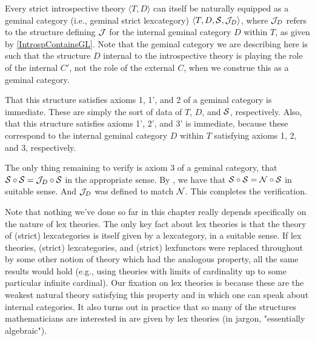 \begin{construction}
Every strict introspective theory $\langle T, D \rangle$ can itself be naturally equipped as a geminal category (i.e., geminal strict lexcategory) $\langle T, D, \mathcal{S}, \mathcal{J}_D \rangle$, where $\mathcal{J}_D$ refers to the structure defining $\mathcal{J}$ for the internal geminal category $D$ within $T$, as given by \cref{IntrospContainsGL}. Note that the geminal category we are describing here is such that the structure $D$ internal to the introspective theory is playing the role of the internal $C'$, not the role of the external $C$, when we construe this as a geminal category.

That this structure satisfies axioms 1, 1', and 2 of a geminal category is immediate. These are simply the sort of data of $T$, $D$, and $\mathcal{S}$, respectively. Also, that this structure satisfies axioms 1', 2', and 3' is immediate, because these correspond to the internal geminal category $D$ within $T$ satisfying axioms 1, 2, and 3, respectively.

The only thing remaining to verify is axiom 3 of a geminal category, that $\mathcal{S} \circ \mathcal{S} = \mathcal{J}_D \circ \mathcal{S}$ in the appropriate sense. By , we have that $\mathcal{S} \circ \mathcal{S} = \mathcal{N} \circ \mathcal{S}$ in suitable sense. And $\mathcal{J}_D$ was defined to match $\mathcal{N}$. This completes the verification.
\end{construction}

Note that nothing we've done so far in this chapter really depends specifically on the nature of lex theories. The only key fact about lex theories is that the theory of (strict) lexcategories is itself given by a lexcategory, in a suitable sense. If lex theories, (strict) lexcategories, and (strict) lexfunctors were replaced throughout by some other notion of theory which had the analogous property, all the same results would hold (e.g., using theories with limits of cardinality up to some particular infinite cardinal). Our fixation on lex theories is because these are the weakest natural theory satisfying this property and in which one can speak about internal categories. It also turns out in practice that so many of the structures mathematicians are interested in are given by lex theories (in jargon, "essentially algebraic").

